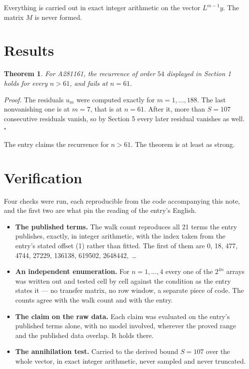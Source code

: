 \documentclass[11pt]{article}
\newtheorem{theorem}{Theorem}
\theoremstyle{definition}
\begin{document}
Everything is carried out in exact integer arithmetic on the vector $L^{m-1}y$. The matrix $M$ is never formed.

\section{Results}

\begin{theorem} For A281161, the recurrence of order $54$ displayed in Section 1 holds for every $n > 61$, and fails at $n = 61$.\end{theorem}

{\itshape Proof.} The residuals $u_m$ were computed exactly for $m = 1,\dots,188$. The last nonvanishing one is at $m = 7$, that is at $n = 61$. After it, more than $S = 107$ consecutive residuals vanish, so by Section 5 every later residual vanishes as well. $\square$

The entry claims the recurrence for $n > 61$. The theorem is at least as strong.

\section{Verification}

Four checks were run, each reproducible from the code accompanying this note, and the first two are what pin the reading of the entry's English.

\begin{itemize}

\item {\bfseries The published terms.} The walk count reproduces all 21 terms the entry publishes, exactly, in integer arithmetic, with the index taken from the entry's stated offset (1) rather than fitted. The first of them are 0, 18, 477, 4744, 27229, 136138, 619502, 2648442,~\dots

\item {\bfseries An independent enumeration.} For $n = 1,\dots,4$ every one of the $2^{4n}$ arrays was written out and tested cell by cell against the condition as the entry states it --- no transfer matrix, no row window, a separate piece of code. The counts agree with the walk count and with the entry.

\item {\bfseries The claim on the raw data.} Each claim was evaluated on the entry's published terms alone, with no model involved, wherever the proved range and the published data overlap. It holds there.

\item {\bfseries The annihilation test.} Carried to the derived bound $S = 107$ over the whole vector, in exact integer arithmetic, never sampled and never truncated.

\end{itemize}
\end{document}
